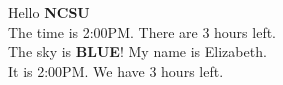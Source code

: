 \documentclass[11pt]{article}
\begin{document}
Hello \textbf{NCSU}
\\The time is 2:00PM.  There are 3 hours left.
\\The sky is \textbf{BLUE}!
My name is Elizabeth.
\\It is 2:00PM.  We have 3 hours left.
\end{document}
